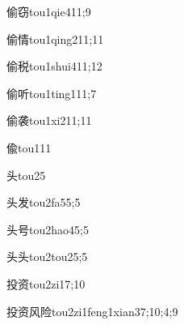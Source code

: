 \begin{verbete}{偷窃}{tou1qie4}{11;9}
\end{verbete}

\begin{verbete}{偷情}{tou1qing2}{11;11}
\end{verbete}

\begin{verbete}{偷税}{tou1shui4}{11;12}
\end{verbete}

\begin{verbete}{偷听}{tou1ting1}{11;7}
\end{verbete}

\begin{verbete}{偷袭}{tou1xi2}{11;11}
\end{verbete}

\begin{verbete}{偸}{tou1}{11}
\end{verbete}

\begin{verbete}{头}{tou2}{5}
\end{verbete}

\begin{verbete}{头发}{tou2fa5}{5;5}
\end{verbete}

\begin{verbete}{头号}{tou2hao4}{5;5}
\end{verbete}

\begin{verbete}{头头}{tou2tou2}{5;5}
\end{verbete}

\begin{verbete}{投资}{tou2zi1}{7;10}
\end{verbete}

\begin{verbete}{投资风险}{tou2zi1feng1xian3}{7;10;4;9}
\end{verbete}

